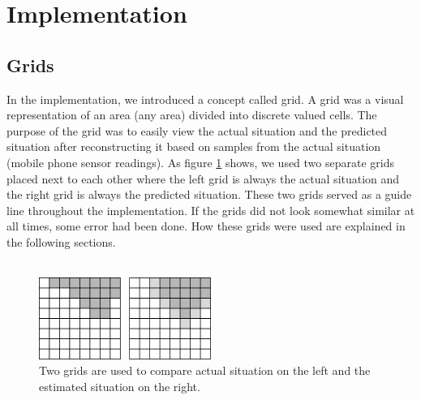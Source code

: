 \section{Implementation}
\subsection{Grids}
In the implementation, we introduced a concept called grid. A grid was a visual representation of an area (any area) divided into discrete valued cells. The purpose of the grid was to easily view the actual situation and the predicted situation after reconstructing it based on samples from the actual situation (mobile phone sensor readings). As figure \ref{fig:grid-concept} shows, we used two separate grids placed next to each other where the left grid is always the actual situation and the right grid is always the predicted situation. These two grids served as a guide line throughout the implementation. If the grids did not look somewhat similar at all times, some error had been done. How these grids were used are explained in the following sections.
\\\\
\begin{figure}[here]
\centering
\includegraphics[width=0.5\textwidth]{solution/graphics/grid-concept.png}
\caption{Two grids are used to compare actual situation on the left and the estimated situation on the right.}
\label{fig:grid-concept}
\end{figure}
\\\\
